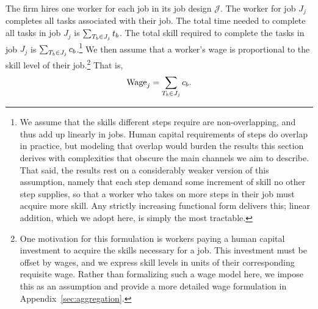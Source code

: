 The firm hires one worker for each job in its job design $\mathcal{J}$.
The worker for job $J_j$ completes all tasks associated with their job.
The total time needed to complete all tasks in job $J_j$ is $\sum_{T_b \in J_j} t_{b}$.
The total skill required to complete the tasks in job $J_j$ is $\sum_{T_b \in J_j} c_{b}$.\footnote{
We assume that the skills different steps require are non-overlapping, and thus add up linearly in jobs.
Human capital requirements of steps do overlap in practice, but modeling that overlap would burden the results this section derives with complexities that obscure the main channels we aim to describe.
That said, the results rest on a considerably weaker version of this assumption, namely that each step demand some increment of skill no other step supplies, so that a worker who takes on more steps in their job must acquire more skill.
Any strictly increasing functional form delivers this; linear addition, which we adopt here, is simply the most tractable.
}
We then assume that a worker's wage is proportional to the skill level of their job.\footnote{
One motivation for this formulation is workers paying a human capital investment to acquire the skills necessary for a job.
This investment must be offset by wages, and we express skill levels in units of their corresponding requisite wage.
Rather than formalizing such a wage model here, we impose this as an assumption and provide a more detailed wage formulation in Appendix~\ref{sec:aggregation}.
}
That is,
\begin{align}
\label{eq:wage}
\text{Wage}_j = \sum_{T_b \in J_j} c_{b}.
\end{align}

